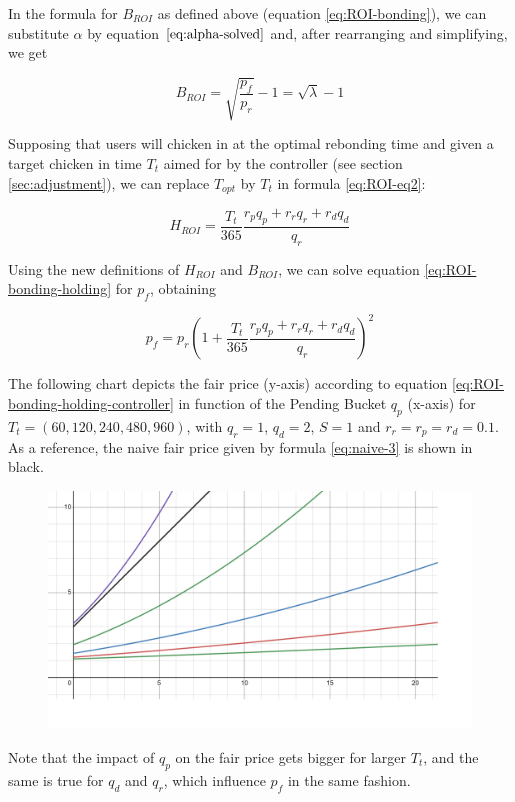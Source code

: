 \documentclass{article}
\begin{document}
In the formula for $B_{ROI}$ as defined above (equation \ref{eq:ROI-bonding}), we can substitute $\alpha$ by equation $\ref{eq:alpha-solved}$ and, after rearranging and simplifying, we get

\begin{equation}
  \label{eq:BROI-controller}
    B_{ROI} = \sqrt{\frac{p_f}{p_r}} - 1 = \sqrt{\lambda} - 1
\end{equation} 

Supposing that users will chicken in at the optimal rebonding time and given a target chicken in time $T_t$ aimed for by the controller (see section \ref{sec:adjustment}), we can replace $T_{opt}$ by $T_t$ in formula \ref{eq:ROI-eq2}:

\begin{equation}
  \label{eq:HROI-controller}
    H_{ROI} = \frac{T_t}{365} \frac{r_p q_p + r_r q_r + r_d q_d}{q_r}
\end{equation} 

Using the new definitions of $H_{ROI}$ and $B_{ROI}$, we can solve equation \ref{eq:ROI-bonding-holding} for $p_f$, obtaining

\begin{equation}
  \label{eq:ROI-bonding-holding-controller}
  p_f = p_r\left(1 + \frac{T_t}{365} \frac{r_p q_p + r_r q_r + r_d q_d}{q_r}\right)^2 
\end{equation}

The following chart depicts the fair price (y-axis) according to equation \ref{eq:ROI-bonding-holding-controller} in function of the Pending Bucket $q_p$ (x-axis) for $T_t=(60, 120, 240, 480, 960)$, with $q_r=1$, $q_d=2$, $S=1$ and $r_r=r_p=r_d=0.1$.
As a reference, the naive fair price given by formula \ref{eq:naive-3} is shown in black.

\begin{figure}
    \centering
    \includegraphics[width=0.5\linewidth]{./ChickenBonds_Whitepaper_controller_price.png}
\end{figure}

Note that the impact of $q_p$ on the fair price gets bigger for larger $T_t$, and the same is true for $q_d$ and $q_r$, which influence $p_f$ in the same fashion.
\end{document}
